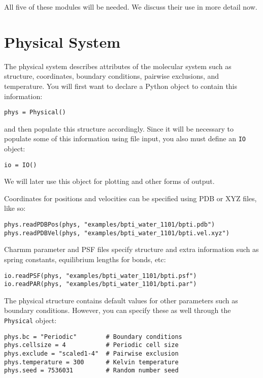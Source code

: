 \documentclass[11pt]{report}
\begin{document}
All five of these modules will be needed.  We discuss their
use in more detail now.

\section{Physical System}

The physical system describes attributes of the 
molecular system such as structure, coordinates, 
boundary conditions, pairwise exclusions, and temperature.
You will first want to declare a Python object
to contain this information:

\begin{verbatim}
phys = Physical()
\end{verbatim}

and then populate this structure accordingly.
Since it will be necessary to populate some of this
information using file input, you also must define an \texttt{IO}
object:

\begin{verbatim}
io = IO()
\end{verbatim}

We will later use this object for plotting and other
forms of output.

Coordinates for positions and velocities can be specified 
using PDB or XYZ files, like so:

\begin{verbatim}
phys.readPDBPos(phys, "examples/bpti_water_1101/bpti.pdb")
phys.readPDBVel(phys, "examples/bpti_water_1101/bpti.vel.xyz")
\end{verbatim}

Charmm parameter and PSF files specify structure and
extra information such as spring constants, equilibrium
lengths for bonds, etc:

\begin{verbatim}
io.readPSF(phys, "examples/bpti_water_1101/bpti.psf")
io.readPAR(phys, "examples/bpti_water_1101/bpti.par")
\end{verbatim}

The physical structure contains default
values for other parameters such as boundary conditions.
However, you can specify these as well through the \texttt{Physical}
object:

\begin{verbatim}
phys.bc = "Periodic"        # Boundary conditions
phys.cellsize = 4           # Periodic cell size
phys.exclude = "scaled1-4"  # Pairwise exclusion
phys.temperature = 300      # Kelvin temperature
phys.seed = 7536031         # Random number seed
\end{verbatim}
\end{document}

